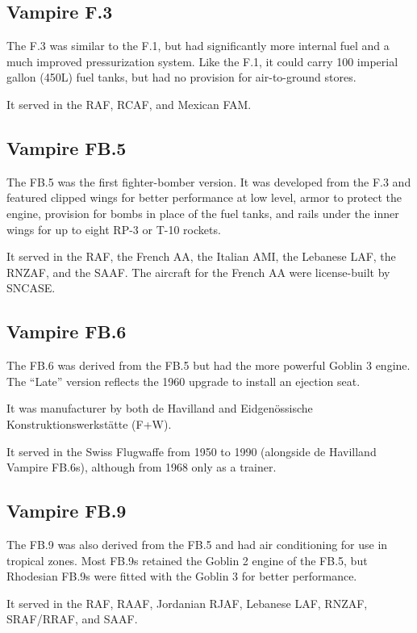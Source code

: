 \subsection{Vampire F.3}

The F.3 was similar to the F.1, but had significantly more internal fuel and a much improved pressurization system. Like the F.1, it could carry 100 imperial gallon (450L) fuel tanks, but had no provision for air-to-ground stores.

It served in the RAF, RCAF, and Mexican FAM.

\subsection{Vampire FB.5}

The FB.5 was the first fighter-bomber version. It was developed from the F.3 and featured clipped wings for better performance at low level, armor to protect the engine, provision for bombs in place of the fuel tanks, and rails under the inner wings for up to eight RP-3 or T-10 rockets.

It served in the RAF, the French AA, the Italian AMI, the Lebanese LAF, the RNZAF, and the SAAF. The aircraft for the French AA were license-built by SNCASE.

\subsection{Vampire FB.6}

The FB.6 was derived from the FB.5 but had the more powerful Goblin 3 engine. The “Late” version reflects the 1960 upgrade to install an ejection seat.

It was manufacturer by both de Havilland and Eidgenössische Konstruktionswerkstätte (F+W).

It served in the Swiss Flugwaffe from 1950 to 1990 (alongside de Havilland Vampire FB.6s), although from 1968 only as a trainer.

\subsection{Vampire FB.9}

The FB.9 was also derived from the FB.5 and had air conditioning for use in tropical zones. Most FB.9s retained the Goblin 2 engine of the FB.5, but Rhodesian FB.9s were fitted with the Goblin 3 for better performance.

It served in the RAF, RAAF, Jordanian RJAF, Lebanese LAF, RNZAF, SRAF/RRAF, and SAAF.

